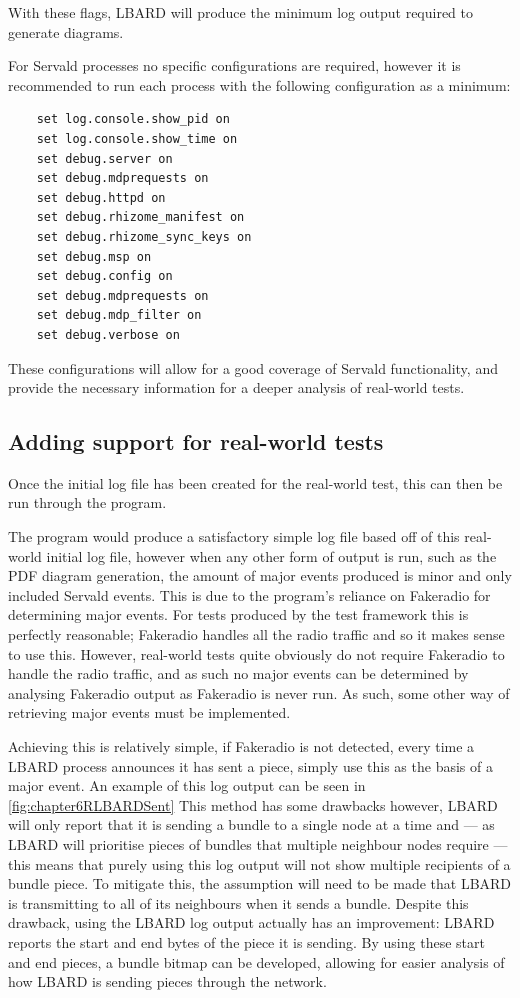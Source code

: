 With these flags, LBARD will produce the minimum log output required to generate diagrams. 

For Servald processes no specific configurations are required, however it is recommended to run each process with the following configuration as a minimum:
\begin{lstlisting}
    set log.console.show_pid on 
    set log.console.show_time on 
    set debug.server on 
    set debug.mdprequests on 
    set debug.httpd on 
    set debug.rhizome_manifest on
    set debug.rhizome_sync_keys on
    set debug.msp on
    set debug.config on
    set debug.mdprequests on
    set debug.mdp_filter on
    set debug.verbose on
\end{lstlisting}
These configurations will allow for a good coverage of Servald functionality, and provide the necessary information for a deeper analysis of real-world tests.


\subsection{Adding support for real-world tests}
Once the initial log file has been created for the real-world test, this can then be run through the program. 

The program would produce a satisfactory simple log file based off of this real-world initial log file, however when any other form of output is run, such as the PDF diagram generation, the amount of major events produced is minor and only included Servald events.
This is due to the program's reliance on Fakeradio for determining major events.
For tests produced by the test framework this is perfectly reasonable; Fakeradio handles all the radio traffic and so it makes sense to use this.
However, real-world tests quite obviously do not require Fakeradio to handle the radio traffic, and as such no major events can be determined by analysing Fakeradio output as Fakeradio is never run.
As such, some other way of retrieving major events must be implemented.

Achieving this is relatively simple, if Fakeradio is not detected, every time a LBARD process announces it has sent a piece, simply use this as the basis of a major event.
An example of this log output can be seen in \figurename{ \ref{fig:chapter6RLBARDSent}}
This method has some drawbacks however, LBARD will only report that it is sending a bundle to a single node at a time and — as LBARD will prioritise pieces of bundles that multiple neighbour nodes require — this means that purely using this log output will not show multiple recipients of a bundle piece.
To mitigate this, the assumption will need to be made that LBARD is transmitting to all of its neighbours when it sends a bundle.
Despite this drawback, using the LBARD log output actually has an improvement: LBARD reports the start and end bytes of the piece it is sending.
By using these start and end pieces, a bundle bitmap can be developed, allowing for easier analysis of how LBARD is sending pieces through the network.

